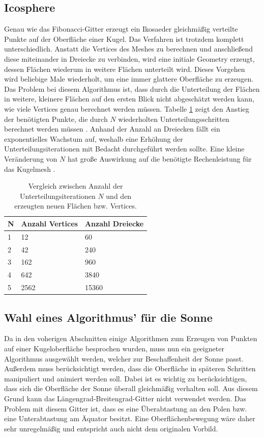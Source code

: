 \subsection{Icosphere}
Genau wie das Fibonacci-Gitter erzeugt ein Ikosaeder gleichmäßig verteilte
Punkte auf der Oberfläche einer Kugel. Das Verfahren ist trotzdem komplett
unterschiedlich. Anstatt die Vertices des Meshes zu berechnen und
anschließend diese miteinander in Dreiecke zu verbinden, wird eine initiale
Geometry erzeugt, dessen Flächen wiederum in weitere Flächen unterteilt wird.
Dieses Vorgehen wird beliebige Male wiederholt, um eine immer glattere
Oberfläche zu erzeugen. Das Problem bei diesem Algorithmus ist, dass durch
die Unterteilung der Flächen in weitere, kleinere Flächen auf den ersten
Blick nicht abgeschätzt werden kann, wie viele Vertices genau berechnet
werden müssen. Tabelle \ref{table:icosahedron-complexity} zeigt den Anstieg
der benötigten Punkte, die durch $N$ wiederholten Unterteilungsschritten
berechnet werden müssen \cite{Marc2019}. Anhand der Anzahl an Dreiecken fällt ein
exponentielles Wachstum auf, weshalb eine Erhöhung der
Unterteilungsiterationen mit Bedacht durchgeführt werden sollte. Eine kleine
Veränderung von $N$ hat große Auswirkung auf die benötigte Rechenleistung für
das Kugelmesh \cite{BlenderPrimitives}.

\begin{table}
  \caption{Vergleich zwischen Anzahl der Unterteilungsiterationen $N$ und den erzeugten neuen Flächen bzw. Vertices.}
  \label{table:icosahedron-complexity}
  \begin{tabularx}{\columnwidth}{lXX}
    \textbf{N} & \textbf{Anzahl Vertices} & \textbf{Anzahl Dreiecke} \\
    \hline
    1 & 12   & 60 \\
    2 & 42   & 240 \\
    3 & 162  & 960 \\
    4 & 642  & 3840 \\
    5 & 2562 & 15360
  \end{tabularx}
\end{table}

\subsection{Wahl eines Algorithmus' für die Sonne}
Da in den voherigen Abschnitten einige Algorithmen zum Erzeugen von Punkten
auf einer Kugeloberfläche besprochen wurden, muss nun ein geeigneter
Algorithmus ausgewählt werden, welcher zur Beschaffenheit der Sonne passt.
Außerdem muss berücksichtigt werden, dass die Oberfläche in späteren
Schritten manipuliert und animiert werden soll. Dabei ist es wichtig zu
berücksichtigen, dass sich die Oberfläche der Sonne überall gleichmäßig
verhalten soll. Aus diesem Grund kann das Längengrad-Breitengrad-Gitter nicht
verwendet werden. Das Problem mit diesem Gitter ist, dass es eine
Überabtastung an den Polen bzw. eine Unterabtastung am Äquator besitzt. Eine
Oberflächenbewegung wäre daher sehr unregelmäßig und entspricht auch nicht dem
originalen Vorbild.

